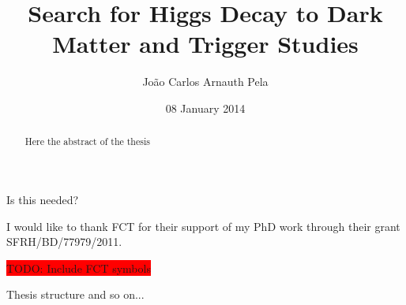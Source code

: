 \documentclass[hyperpdf]{hepthesis}
\title{Search for Higgs Decay to Dark Matter and Trigger Studies}
\author{João Carlos Arnauth Pela}
\date{08 January 2014}
\begin{document}
\begin{frontmatter}

  
\begin{abstract}
Here the abstract of the thesis
\end{abstract}

\begin{declaration}
Is this needed?
\end{declaration}

\begin{acknowledgements}
I would like to thank \gls{FCT} for their support of my PhD work through their grant SFRH/BD/77979/2011. 

\colorbox{red}{TODO: Include FCT symbols}

\end{acknowledgements}

\begin{preface}
Thesis structure and so on...
\end{preface}

\dedication{To all who study...}

\tableofcontents

  
\end{frontmatter}

\begin{mainmatter}

  
  
  
  
  
  

\end{mainmatter}

\begin{backmatter}



\end{backmatter}
\end{document}

